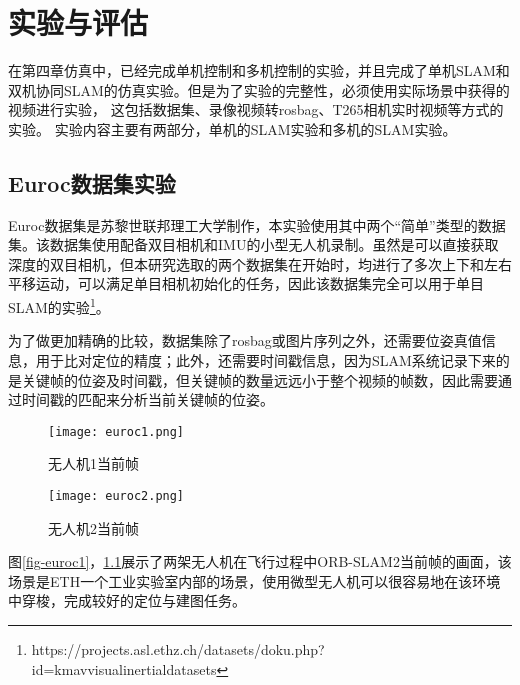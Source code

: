 \renewcommand{\baselinestretch}{1.5}
\fontsize{12pt}{13pt}\selectfont

\chapter{实验与评估} \label{experiment}

在第四章仿真中，已经完成单机控制和多机控制的实验，并且完成了单机SLAM和双机协同SLAM的仿真实验。但是为了实验的完整性，必须使用实际场景中获得的视频进行实验，
这包括数据集、录像视频转rosbag、T265相机实时视频等方式的实验。
实验内容主要有两部分，单机的SLAM实验和多机的SLAM实验。

\section{Euroc数据集实验}

Euroc数据集是苏黎世联邦理工大学制作，本实验使用其中两个“简单”类型的数据集。该数据集使用配备双目相机和IMU的小型无人机录制。虽然是可以直接获取深度的双目相机，但本研究选取的两个数据集在开始时，均进行了多次上下和左右平移运动，可以满足单目相机初始化的任务，因此该数据集完全可以用于单目SLAM的实验\footnote{https://projects.asl.ethz.ch/datasets/doku.php?id=kmavvisualinertialdatasets}。

为了做更加精确的比较，数据集除了rosbag或图片序列之外，还需要位姿真值信息，用于比对定位的精度；此外，还需要时间戳信息，因为SLAM系统记录下来的是关键帧的位姿及时间戳，但关键帧的数量远远小于整个视频的帧数，因此需要通过时间戳的匹配来分析当前关键帧的位姿。
~\\
\begin{figure}[htbp]
	\centering
	\begin{minipage}[t]{0.45\columnwidth} %
		\centering
		\texttt{[image: euroc1.png]}
		\caption{无人机1当前帧}
		\label{fig-euroc1}
	\end{minipage}
	\begin{minipage}[t]{0.45\columnwidth}
		\centering
		\texttt{[image: euroc2.png]}
		\caption{无人机2当前帧}
		\label{fig-euroc2}
	\end{minipage}
\end{figure}

图\ref{fig-euroc1}，\ref{fig-euroc2}展示了两架无人机在飞行过程中ORB-SLAM2当前帧的画面，该场景是ETH一个工业实验室内部的场景，使用微型无人机可以很容易地在该环境中穿梭，完成较好的定位与建图任务。

